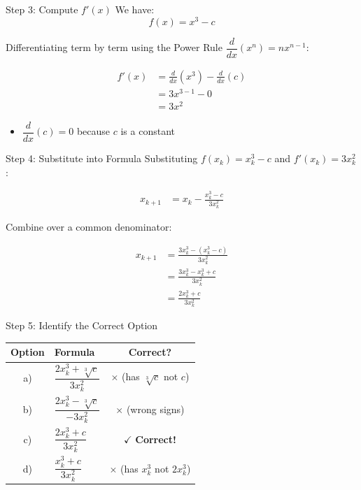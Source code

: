 \documentclass{beamer}
\begin{document}
\begin{frame}{Step 3: Compute $f'(x)$}
We have:
\[
f(x) = x^3 - c
\]

Differentiating term by term using the Power Rule $\dfrac{d}{dx}(x^n) = nx^{n-1}$:

\begin{align}
f'(x) &= \frac{d}{dx}(x^3) - \frac{d}{dx}(c) \\[6pt]
      &= 3x^{3-1} - 0 \\[6pt]
      &= 3x^2
\end{align}

\begin{itemize}
    \item $\dfrac{d}{dx}(c) = 0$ because $c$ is a constant
\end{itemize}
\end{frame}

\begin{frame}{Step 4: Substitute into Formula}
Substituting $f(x_k) = x_k^3 - c$ and $f'(x_k) = 3x_k^2$:

\begin{align}
x_{k+1} &= x_k - \frac{x_k^3 - c}{3x_k^2}
\end{align}

Combine over a common denominator:

\begin{align}
x_{k+1} &= \frac{3x_k^3 - (x_k^3 - c)}{3x_k^2} \\[6pt]
         &= \frac{3x_k^3 - x_k^3 + c}{3x_k^2} \\[6pt]
         &= \frac{2x_k^3 + c}{3x_k^2}
\end{align}
\end{frame}

\begin{frame}{Step 5: Identify the Correct Option}

\begin{center}
\renewcommand{\arraystretch}{2.0}
\begin{tabular}{clc}
\toprule
\textbf{Option} & \textbf{Formula} & \textbf{Correct?} \\
\midrule
a) & $\dfrac{2x_k^3 + \sqrt[3]{c}}{3x_k^2}$ & $\times$ \small{(has $\sqrt[3]{c}$ not $c$)} \\
b) & $\dfrac{2x_k^3 - \sqrt[3]{c}}{-3x_k^2}$ & $\times$ \small{(wrong signs)} \\
c) & $\dfrac{2x_k^3 + c}{3x_k^2}$ & $\checkmark$ \textbf{Correct!} \\
d) & $\dfrac{x_k^3 + c}{3x_k^2}$ & $\times$ \small{(has $x_k^3$ not $2x_k^3$)} \\
\bottomrule
\end{tabular}
\end{center}

\end{frame}
\end{document}
